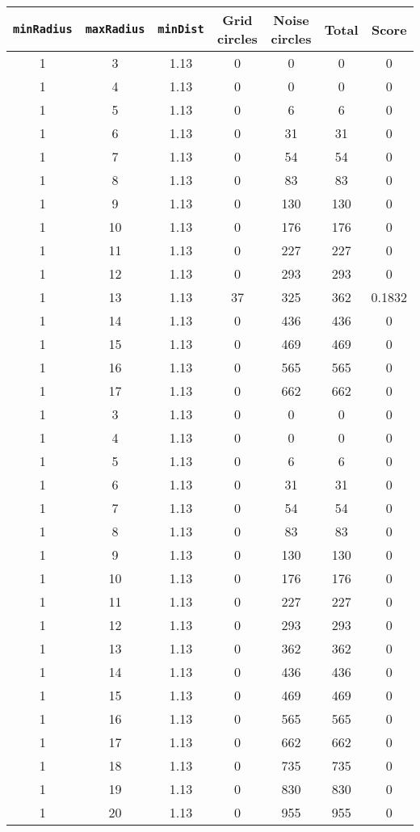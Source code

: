 \documentclass[letterpaper, 12pt]{article}
\begin{document}
\begin{longtable}{|c|c|c|c|c|c|c|}
\hline
\textbf{\texttt{minRadius}} & \textbf{\texttt{maxRadius}} & \textbf{\texttt{minDist}} & \textbf{Grid circles} & \textbf{Noise circles} & \textbf{Total} & \textbf{Score} \\
\hline
1 & 3 & 1.13 & 0 & 0 & 0 & 0 \\
\hline
1 & 4 & 1.13 & 0 & 0 & 0 & 0 \\
\hline
1 & 5 & 1.13 & 0 & 6 & 6 & 0 \\
\hline
1 & 6 & 1.13 & 0 & 31 & 31 & 0 \\
\hline
1 & 7 & 1.13 & 0 & 54 & 54 & 0 \\
\hline
1 & 8 & 1.13 & 0 & 83 & 83 & 0 \\
\hline
1 & 9 & 1.13 & 0 & 130 & 130 & 0 \\
\hline
1 & 10 & 1.13 & 0 & 176 & 176 & 0 \\
\hline
1 & 11 & 1.13 & 0 & 227 & 227 & 0 \\
\hline
1 & 12 & 1.13 & 0 & 293 & 293 & 0 \\
\hline
1 & 13 & 1.13 & 37 & 325 & 362 & 0.1832 \\
\hline
1 & 14 & 1.13 & 0 & 436 & 436 & 0 \\
\hline
1 & 15 & 1.13 & 0 & 469 & 469 & 0 \\
\hline
1 & 16 & 1.13 & 0 & 565 & 565 & 0 \\
\hline
1 & 17 & 1.13 & 0 & 662 & 662 & 0 \\
\hline
1 & 3 & 1.13 & 0 & 0 & 0 & 0 \\
\hline
1 & 4 & 1.13 & 0 & 0 & 0 & 0 \\
\hline
1 & 5 & 1.13 & 0 & 6 & 6 & 0 \\
\hline
1 & 6 & 1.13 & 0 & 31 & 31 & 0 \\
\hline
1 & 7 & 1.13 & 0 & 54 & 54 & 0 \\
\hline
1 & 8 & 1.13 & 0 & 83 & 83 & 0 \\
\hline
1 & 9 & 1.13 & 0 & 130 & 130 & 0 \\
\hline
1 & 10 & 1.13 & 0 & 176 & 176 & 0 \\
\hline
1 & 11 & 1.13 & 0 & 227 & 227 & 0 \\
\hline
1 & 12 & 1.13 & 0 & 293 & 293 & 0 \\
\hline
1 & 13 & 1.13 & 0 & 362 & 362 & 0 \\
\hline
1 & 14 & 1.13 & 0 & 436 & 436 & 0 \\
\hline
1 & 15 & 1.13 & 0 & 469 & 469 & 0 \\
\hline
1 & 16 & 1.13 & 0 & 565 & 565 & 0 \\
\hline
1 & 17 & 1.13 & 0 & 662 & 662 & 0 \\
\hline
1 & 18 & 1.13 & 0 & 735 & 735 & 0 \\
\hline
1 & 19 & 1.13 & 0 & 830 & 830 & 0 \\
\hline
1 & 20 & 1.13 & 0 & 955 & 955 & 0 \\
\hline
\end{longtable}
\end{document}
